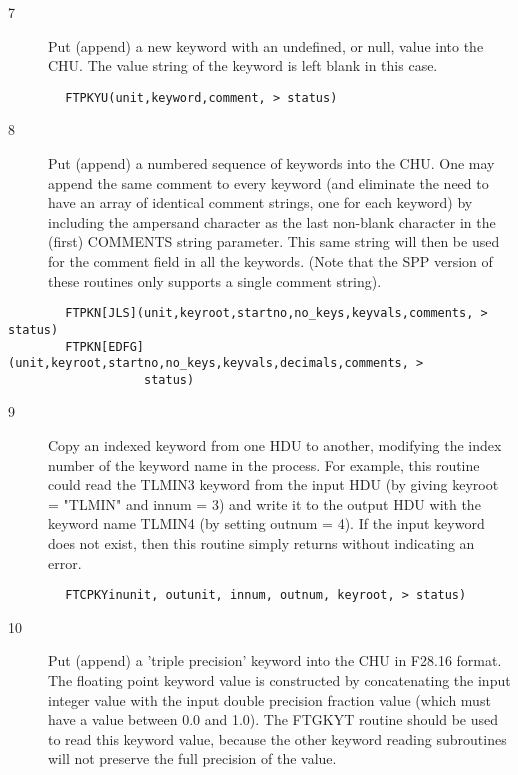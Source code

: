 \documentclass[11pt]{book}
\begin{document}
\begin{description}
\item[7 ] Put (append) a new keyword with an undefined, or null, value into the CHU.
   The value string of the keyword is left blank in this case.
\end{description}

\begin{verbatim}
        FTPKYU(unit,keyword,comment, > status)
\end{verbatim}

\begin{description}
\item[8 ] Put (append) a numbered sequence of keywords into the CHU.   One may
    append the same comment to every keyword (and eliminate the need
    to have an array of identical comment strings, one for each keyword) by
    including the ampersand character as the last non-blank character in the
    (first) COMMENTS string parameter.  This same string
    will then be used for the comment field in all the keywords. (Note
    that the SPP version of these routines only supports a single comment
   string).
\end{description}

\begin{verbatim}
        FTPKN[JLS](unit,keyroot,startno,no_keys,keyvals,comments, > status)
        FTPKN[EDFG](unit,keyroot,startno,no_keys,keyvals,decimals,comments, >
                   status)
\end{verbatim}

\begin{description}
\item[9 ]Copy an indexed keyword from one HDU to another, modifying
    the index number of the keyword name in the process.  For example,
    this routine could read the TLMIN3 keyword from the input HDU
    (by giving keyroot = "TLMIN" and innum = 3) and write it to the
    output HDU with the keyword name TLMIN4 (by setting outnum = 4).
    If the input keyword does not exist, then this routine simply
   returns without indicating an error.
\end{description}

\begin{verbatim}
        FTCPKYinunit, outunit, innum, outnum, keyroot, > status)
\end{verbatim}

\begin{description}
\item[10] Put (append) a 'triple precision' keyword into the CHU in F28.16 format.
    The floating point keyword value is constructed by concatenating the
    input integer value with the input double precision fraction value
    (which must have a value between 0.0 and 1.0). The FTGKYT routine should
    be used to read this keyword value, because the other keyword reading
   subroutines will not preserve the full precision of the value.
\end{description}
\end{document}
